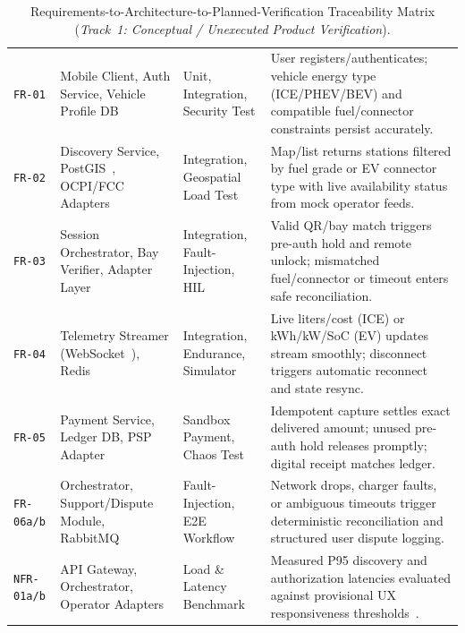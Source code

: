 \begin{table}[htbp]
  \centering
  \caption{Requirements-to-Architecture-to-Planned-Verification Traceability Matrix (\emph{Track~1: Conceptual / Unexecuted Product Verification}).}
  \label{tab:traceability-matrix}
  {\footnotesize
  \begin{tabularx}{\linewidth}{@{}P{20mm} P{36mm} P{32mm} L@{}}
    \toprule
     &  &  &  \\
    \midrule
    \texttt{FR-01} & Mobile Client, Auth Service, Vehicle Profile DB & Unit, Integration, Security Test & User registers/authenticates; vehicle energy type (ICE/PHEV/BEV) and compatible fuel/connector constraints persist accurately. \\
    \texttt{FR-02} & Discovery Service, PostGIS~\cite{postgis2025docs}, OCPI/FCC Adapters & Integration, Geospatial Load Test & Map/list returns stations filtered by fuel grade or EV connector type with live availability status from mock operator feeds. \\
    \texttt{FR-03} & Session Orchestrator, Bay Verifier, Adapter Layer & Integration, Fault-Injection, HIL & Valid QR/bay match triggers pre-auth hold and remote unlock; mismatched fuel/connector or timeout enters safe reconciliation. \\
    \texttt{FR-04} & Telemetry Streamer (WebSocket~\cite{rfc6455}), Redis~\cite{redis2025docs} & Integration, Endurance, Simulator & Live liters/cost (ICE) or kWh/kW/SoC (EV) updates stream smoothly; disconnect triggers automatic reconnect and state resync. \\
    \texttt{FR-05} & Payment Service, Ledger DB, PSP Adapter & Sandbox Payment, Chaos Test & Idempotent capture settles exact delivered amount; unused pre-auth hold releases promptly; digital receipt matches ledger. \\
    \texttt{FR-06a/b} & Orchestrator, Support/Dispute Module, RabbitMQ~\cite{rabbitmq2025docs} & Fault-Injection, E2E Workflow & Network drops, charger faults, or ambiguous timeouts trigger deterministic reconciliation and structured user dispute logging. \\
    \texttt{NFR-01a/b} & API Gateway, Orchestrator, Operator Adapters & Load \& Latency Benchmark & Measured P95 discovery and authorization latencies evaluated against provisional UX responsiveness thresholds~\cite{nielsen1993responsetimes}. \\

\end{tabularx}}
\end{table}
